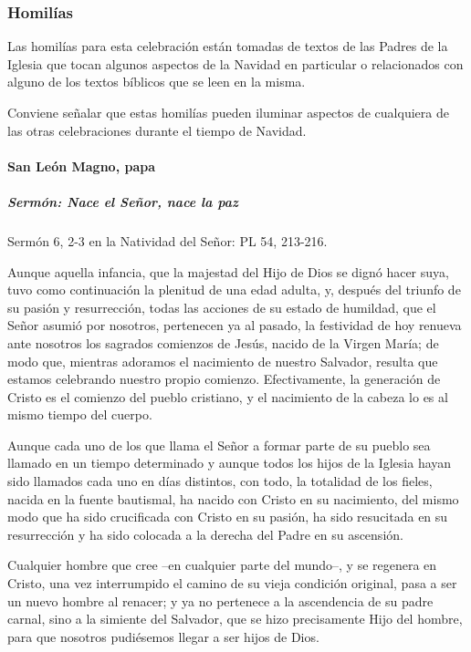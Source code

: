 \documentclass[]{article}
\let\oldparagraph\paragraph
\renewcommand{\paragraph}[1]{\oldparagraph{#1}\mbox{}}
\let\oldsubparagraph\subparagraph
\renewcommand{\subparagraph}[1]{\oldsubparagraph{#1}\mbox{}}
\begin{document}
\subsubsection{Homilías}\label{homiluxedas-7}

Las homilías para esta celebración están tomadas de textos de las Padres
de la Iglesia que tocan algunos aspectos de la Navidad en particular o
relacionados con alguno de los textos bíblicos que se leen en la misma.

Conviene señalar que estas homilías pueden iluminar aspectos de
cualquiera de las otras celebraciones durante el tiempo de Navidad.

\paragraph{San León Magno, papa}\label{san-leuxf3n-magno-papa}

\subparagraph{Sermón: Nace el Señor, nace la
paz}\label{sermuxf3n-nace-el-seuxf1or-nace-la-paz}

Sermón 6, 2-3 en la Natividad del Señor: PL 54, 213-216.

Aunque aquella infancia, que la majestad del Hijo de Dios se dignó hacer
suya, tuvo como continuación la plenitud de una edad adulta, y, después
del triunfo de su pasión y resurrección, todas las acciones de su estado
de humildad, que el Señor asumió por nosotros, pertenecen ya al pasado,
la festividad de hoy renueva ante nosotros los sagrados comienzos de
Jesús, nacido de la Virgen María; de modo que, mientras adoramos el
nacimiento de nuestro Salvador, resulta que estamos celebrando nuestro
propio comienzo. Efectivamente, la generación de Cristo es el comienzo
del pueblo cristiano, y el nacimiento de la cabeza lo es al mismo tiempo
del cuerpo.

Aunque cada uno de los que llama el Señor a formar parte de su pueblo
sea llamado en un tiempo determinado y aunque todos los hijos de la
Iglesia hayan sido llamados cada uno en días distintos, con todo, la
totalidad de los fieles, nacida en la fuente bautismal, ha nacido con
Cristo en su nacimiento, del mismo modo que ha sido crucificada con
Cristo en su pasión, ha sido resucitada en su resurrección y ha sido
colocada a la derecha del Padre en su ascensión.

Cualquier hombre que cree --en cualquier parte del mundo--, y se
regenera en Cristo, una vez interrumpido el camino de su vieja condición
original, pasa a ser un nuevo hombre al renacer; y ya no pertenece a la
ascendencia de su padre carnal, sino a la simiente del Salvador, que se
hizo precisamente Hijo del hombre, para que nosotros pudiésemos llegar a
ser hijos de Dios.
\end{document}
